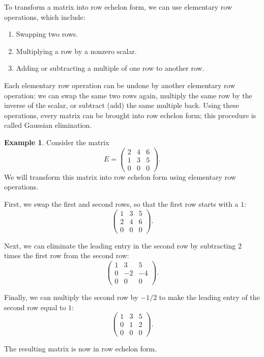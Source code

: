 \documentclass[11pt]{article}
\theoremstyle{definition}
\newtheorem{example}[definition]{Example}
\theoremstyle{plain}
\theoremstyle{remark}
\begin{document}
To transform a matrix into row echelon form, we can use elementary row operations, which include:
\begin{enumerate}
    \item Swapping two rows.
    \item Multiplying a row by a nonzero scalar.
    \item Adding or subtracting a multiple of one row to another row.
\end{enumerate}
Each elementary row operation can be undone by another elementary row operation: we can swap the same two rows again, multiply the same row by the inverse of the scalar, or subtract (add) the same multiple back. Using these operations, every matrix can be brought into row echelon form; this procedure is called Gaussian elimination.

\begin{example}
    Consider the matrix
    \[E = \begin{pmatrix}
        2 & 4 & 6 \\
        1 & 3 & 5 \\
        0 & 0 & 0
    \end{pmatrix}.\]
    We will transform this matrix into row echelon form using elementary row operations.

    First, we swap the first and second rows, so that the first row starts with a $1$:
    \[\begin{pmatrix}
        1 & 3 & 5 \\
        2 & 4 & 6 \\
        0 & 0 & 0
    \end{pmatrix}.\]

    Next, we can eliminate the leading entry in the second row by subtracting $2$ times the first row from the second row:
    \[\begin{pmatrix}
        1 & 3 & 5 \\
        0 & -2 & -4 \\
        0 & 0 & 0
    \end{pmatrix}.\]

    Finally, we can multiply the second row by $-1/2$ to make the leading entry of the second row equal to $1$:
    \[\begin{pmatrix}
        1 & 3 & 5 \\
        0 & 1 & 2 \\
        0 & 0 & 0
    \end{pmatrix}.\]

    The resulting matrix is now in row echelon form.
\end{example}
\end{document}
